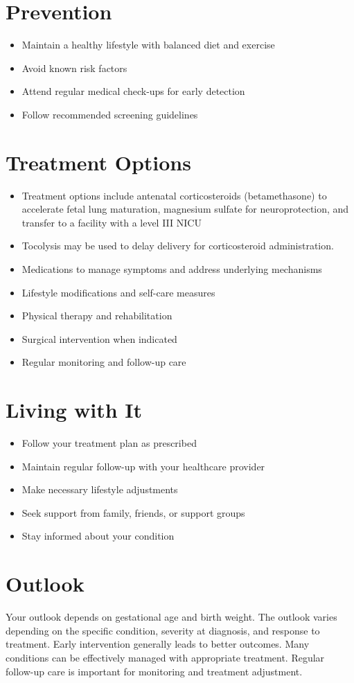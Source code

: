 \section{Prevention}
\begin{itemize}[noitemsep]
  \item Maintain a healthy lifestyle with balanced diet and exercise
  \item Avoid known risk factors
  \item Attend regular medical check-ups for early detection
  \item Follow recommended screening guidelines
\end{itemize}
\section{Treatment Options}
\begin{itemize}[noitemsep]
  \item Treatment options include antenatal corticosteroids (betamethasone) to accelerate fetal lung maturation, magnesium sulfate for neuroprotection, and transfer to a facility with a level III NICU
  \item Tocolysis may be used to delay delivery for corticosteroid administration.
  \item Medications to manage symptoms and address underlying mechanisms
  \item Lifestyle modifications and self-care measures
  \item Physical therapy and rehabilitation
  \item Surgical intervention when indicated
  \item Regular monitoring and follow-up care
\end{itemize}
\section{Living with It}
\begin{itemize}[noitemsep]
  \item Follow your treatment plan as prescribed
  \item Maintain regular follow-up with your healthcare provider
  \item Make necessary lifestyle adjustments
  \item Seek support from family, friends, or support groups
  \item Stay informed about your condition
\end{itemize}
\section{Outlook}
Your outlook depends on gestational age and birth weight. The outlook varies depending on the specific condition, severity at diagnosis, and response to treatment. Early intervention generally leads to better outcomes. Many conditions can be effectively managed with appropriate treatment. Regular follow-up care is important for monitoring and treatment adjustment.

